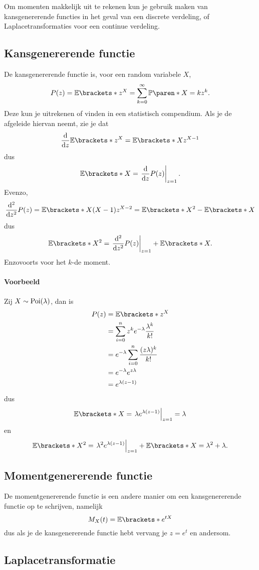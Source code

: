 Om momenten makkelijk uit te rekenen kun je gebruik maken van kansgenererende functies in het geval van een discrete verdeling, of Laplacetransformaties voor een continue verdeling.

\subsection{Kansgenererende functie}

De kansgenererende functie is, voor een random variabele $X$,
\[
    P(z) = \E{z^X} = \sum_{k=0}^\infty \P{X=k} z^k.
\]
Deze kun je uitrekenen of vinden in een statistisch compendium.
Als je de afgeleide hiervan neemt, zie je dat
\[
    \frac{\d}{\d z} \E{z^X} = \E{Xz^{X-1}}
\]
dus
\[
    \E{X} = \eval{\frac{\d}{\d z} P(z)}_{z=1}.
\]
Evenzo,
\[
    \frac{\d^2}{\d z^2} P(z) = \E{X(X-1)z^{X-2}} = \E{X^2} - \E{X}
\]
dus
\[
    \E{X^2} = \eval{\frac{\d^2}{\d z^2} P(z)}_{z=1} + \E{X}.
\]
Enzovoorts voor het $k$-de moment.

\paragraph{Voorbeeld}
Zij $X \sim \operatorname{Poi}(\lambda)$, dan is 
\begin{align*}
    P(z) &= \E{z^X} \\
    &= \sumin z^k e^{-\lambda} \frac{\lambda^k}{k!} \\
    &= e^{-\lambda} \sumin \frac{(z\lambda)^k}{k!} \\
    &= e^{-\lambda} e^{z\lambda} \\
    &= e^{\lambda (z-1)}
\end{align*}
dus
\[
    \E{X} = \eval{\lambda e^{\lambda (z-1)}}_{z=1} = \lambda
\]
en
\[
    \E{X^2} = \eval{\lambda^2 e^{\lambda (z-1)}}_{z=1} + \E{X} = \lambda^2 + \lambda .
\]

\subsection{Momentgenererende functie}

De momentgenererende functie is een andere manier om een kansgenererende functie op te schrijven, namelijk
\[
    M_X(t) = \E{e^{tX}}
\]
dus als je de kansgenererende functie hebt vervang je $z=e^t$ en andersom.

\subsection{Laplacetransformatie}

